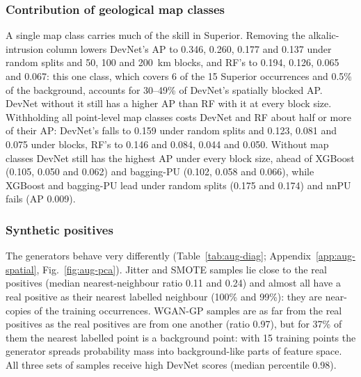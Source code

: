 \documentclass[pdflatex,sn-apa]{sn-jnl}
\begin{document}
\subsubsection{Contribution of geological map classes}\label{sec:res-featuresets}

A single map class carries much of the skill in Superior. Removing the alkalic-intrusion column lowers DevNet's AP to 0.346, 0.260, 0.177 and 0.137 under random splits and 50, 100 and 200~km blocks, and RF's to 0.194, 0.126, 0.065 and 0.067: this one class, which covers 6 of the 15 Superior occurrences and 0.5\% of the background, accounts for 30--49\% of DevNet's spatially blocked AP. DevNet without it still has a higher AP than RF with it at every block size. Withholding all point-level map classes costs DevNet and RF about half or more of their AP: DevNet's falls to 0.159 under random splits and 0.123, 0.081 and 0.075 under blocks, RF's to 0.146 and 0.084, 0.044 and 0.050. Without map classes DevNet still has the highest AP under every block size, ahead of XGBoost (0.105, 0.050 and 0.062) and bagging-PU (0.102, 0.058 and 0.066), while XGBoost and bagging-PU lead under random splits (0.175 and 0.174) and nnPU fails (AP 0.009).

\subsubsection{Synthetic positives}\label{sec:res-augmentation}

The generators behave very differently (Table~\ref{tab:aug-diag}; Appendix~\ref{app:aug-spatial}, Fig.~\ref{fig:aug-pca}). Jitter and SMOTE samples lie close to the real positives (median nearest-neighbour ratio 0.11 and 0.24) and almost all have a real positive as their nearest labelled neighbour (100\% and 99\%): they are near-copies of the training occurrences. WGAN-GP samples are as far from the real positives as the real positives are from one another (ratio 0.97), but for 37\% of them the nearest labelled point is a background point: with 15 training points the generator spreads probability mass into background-like parts of feature space. All three sets of samples receive high DevNet scores (median percentile 0.98).
\end{document}
